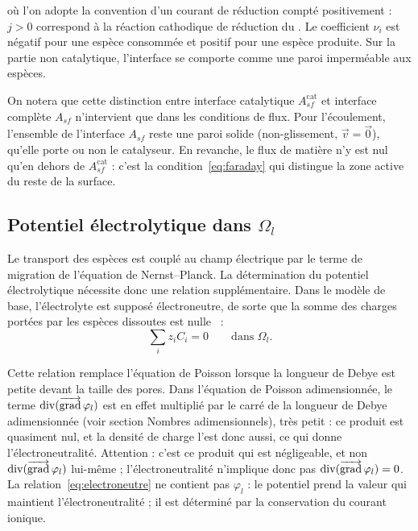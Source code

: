 où l'on adopte la convention d'un courant de réduction compté positivement :
$j > 0$ correspond à la réaction cathodique de réduction du . Le
coefficient $\nu_i$ est négatif pour une espèce consommée et positif pour une
espèce produite. Sur la partie non catalytique, l'interface
se comporte comme une paroi imperméable aux espèces.

On notera que cette distinction entre interface catalytique $A_{sf}^{\mathrm{cat}}$
et interface complète $A_{sf}$ n'intervient que dans les conditions de flux. Pour
l'écoulement, l'ensemble de l'interface $A_{sf}$ reste une paroi solide (non-glissement,
$\vec{v} = \vec{0}$), qu'elle porte ou non le catalyseur. En revanche, le flux de matière n'y est nul
qu'en dehors de $A_{sf}^{\mathrm{cat}}$ : c'est la condition~\eqref{eq:faraday} qui
distingue la zone active du reste de la surface.


\subsection*{Potentiel électrolytique dans $\Omega_l$}
Le transport des espèces est couplé au champ électrique par
le terme de migration de l'équation de Nernst--Planck. La détermination
du potentiel électrolytique nécessite donc une relation supplémentaire.
Dans le modèle de base, l'électrolyte est supposé électroneutre, de sorte
que la somme des charges portées par les espèces dissoutes est nulle~\cite{newmanElectrochemicalSystems} :
\begin{equation}
\sum_i z_i C_i = 0
\qquad \text{dans } \Omega_l .
\label{eq:electroneutre}
\end{equation}

Cette relation remplace l'équation de Poisson lorsque la longueur de Debye
est petite devant la taille des pores. Dans l'équation de Poisson
adimensionnée, le terme $\operatorname{div}(\mathop{\overrightarrow{\operatorname{grad}}}\nolimits\varphi_l)$ est en effet multiplié par le
carré de la longueur de Debye adimensionnée (voir section
\og Nombres adimensionnels\fg{}), très petit : ce produit est
quasiment nul, et la densité de charge l'est donc aussi, ce qui donne
l'électroneutralité. Attention : c'est ce produit qui est négligeable, et non
$\operatorname{div}(\mathop{\overrightarrow{\operatorname{grad}}}\nolimits\varphi_l)$ lui-même ; l'électroneutralité n'implique donc pas
$\operatorname{div}(\mathop{\overrightarrow{\operatorname{grad}}}\nolimits\varphi_l) = 0$. La relation~\eqref{eq:electroneutre} ne contient
pas $\varphi_l$ : le potentiel prend la valeur qui maintient
l'électroneutralité ; il est déterminé par la conservation du courant ionique.

